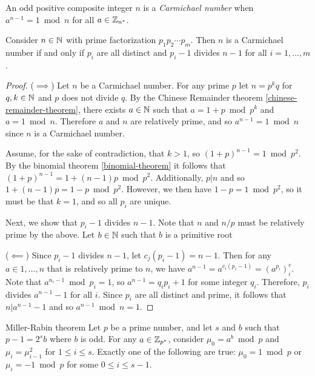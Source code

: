 \begin{defn}
    An odd positive composite integer $n$ is a \emph{Carmichael number} when $a^{n-1} = 1 \bmod n$ for all $a \in \mathbb{Z}_{n^*}$.
\end{defn}

\begin{thm}
    Consider $n \in \mathbb{N}$ with prime factorization $p_1p_2\cdots p_m$. Then $n$ is a Carmichael number if and only if $p_i$ are all distinct and $p_{i}-1$ divides $n-1$ for all $i = 1, \ldots, m$.
\end{thm}

\begin{proof}\proofbreak
    ($\implies$) Let $n$ be a Carmichael number. For any prime $p$ let $n = p^{k}q$ for $q, k \in \mathbb{N}$ and $p$ does not divide $q$. By the Chinese Remainder theorem \ref{chinese-remainder-theorem}, there exists $a \in \mathbb{N}$ such that $a = 1 + p \bmod p^{k}$ and $a = 1 \bmod n$. Therefore $a$ and $n$ are relatively prime, and so $a^{n-1} = 1 \bmod n$ since $n$ is a Carmichael number.

    Assume, for the sake of contradiction, that $k > 1$, so $(1 + p)^{n-1} = 1 \bmod p^{2}$. By the binomial theorem \ref{binomial-theorem} it follows that $(1 + p)^{n-1} = 1 + (n-1)p \bmod p^2$. Additionally, $p | n$ and so $1 + (n-1)p = 1 - p \bmod p^2$. However, we then have $1 - p = 1 \bmod p^2$, so it must be that $k = 1$, and so all $p_i$ are unique.

    Next, we show that $p_i - 1$ divides $n-1$. Note that $n$ and $n/p$ must be relatively prime by the above. Let $b \in \mathbb{N}$ such that $b$ is a primitive root

    ($\impliedby$)
    Since $p_i - 1$ divides $n-1$, let $c_j(p_i - 1) = n-1$. Then for any $a \in 1, \ldots, n$ that is relatively prime to $n$, we have $a^{n-1} = a^{c_i(p_i - 1)} = \left(a^{p_i}\right)^c_i$. Note that $a^{n_i-1} \bmod p_i = 1$, so $a^{n - 1} = q_ip_i + 1$ for some integer $q_i$. Therefore, $p_i$ divides $a^{n-1} - 1$ for all $i$. Since $p_i$ are all distinct and prime, it follows that $n | a^{n-1} - 1$ and so $a^{n-1} \bmod n = 1$.
\end{proof}

\begin{thm}{Miller-Rabin theorem}\proofbreak
    Let $p$ be a prime number, and let $s$ and $b$ such that $p - 1 = 2^{s}b$ where $b$ is odd. For any $a \in \mathbb{Z}_{p^*}$, consider $\mu_0 = a^{b} \bmod p$ and $\mu_i = \mu_{i-1}^{2}$ for $1 \leq i \leq s$. Exactly one of the following are true: $\mu_0 = 1 \bmod p$ or $\mu_i = -1 \bmod p$ for some $0 \leq i \leq s-1$.
\end{thm}

